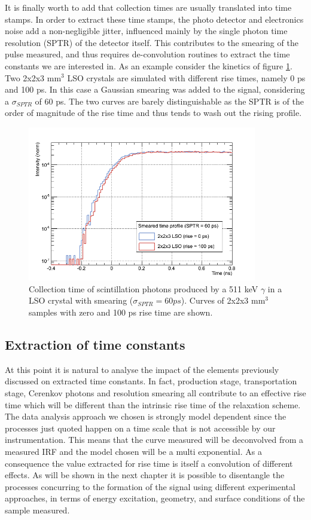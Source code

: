 It is finally worth to add that collection times are usually translated into time stamps. In order to extract these time stamps, the photo detector and electronics noise add a non-negligible jitter, influenced mainly by the single photon time resolution (SPTR) of the detector itself. This contributes to the smearing of the pulse measured, and thus requires de-convolution routines to extract the time constants we are interested in. As an example consider the kinetics of figure \ref{fig:smear_tot}. Two 2x2x3 mm$^{3}$ LSO crystals are simulated with different rise times, namely 0 ps and 100 ps. In this case a Gaussian smearing was added to the signal, considering a $\sigma _{SPTR}$ of 60 ps. The two curves are barely distinguishable as the SPTR is of the order of magnitude of the rise time and thus tends to wash out the rising profile.   

\begin{figure}[htbp]
\begin{center}
\includegraphics[width=10cm]{../Pictures/Chapter_6/smear_profile.png}
\end{center}
\caption[Collection scintillation times for LSO naked with SPTR smearing]{Collection time of scintillation photons produced by a 511 keV $\gamma$ in a LSO crystal with smearing ($\sigma _{SPTR} = 60 ps$). Curves of 2x2x3 mm$^{3}$ samples with zero  and 100 ps rise time are shown.}
\label{fig:smear_tot}
\end{figure}
\newpage
\subsection{Extraction of time constants}
At this point it is natural to analyse the impact of the elements previously discussed on extracted time constants.
In fact, production stage, transportation stage, Cerenkov photons and resolution smearing all contribute to an effective rise time which will be different than the intrinsic rise time of the relaxation scheme. 
The data analysis approach we chosen is strongly model dependent since the processes just quoted happen on a time scale that is not accessible by our instrumentation. This means that the curve measured will be deconvolved from a measured IRF and the model chosen will be a multi exponential. As a consequence the value extracted for rise time is itself a convolution of different effects.
As will be shown in the next chapter it is possible to disentangle the processes concurring to the formation of the signal using different experimental approaches, in terms of energy excitation, geometry, and surface conditions of the sample measured.

